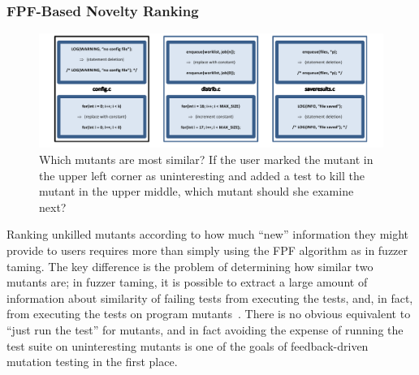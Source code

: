 \subsubsection{FPF-Based Novelty Ranking}
\label{sec:fpfplan}

\begin{figure}[t]
\centering
\includegraphics[width=0.95\columnwidth]{distmetric}

\caption{Which mutants are most similar?  If the user marked the
  mutant in the upper left corner as uninteresting and added a test
  to kill the
  mutant in the upper middle, which mutant
  should she examine next?}
\label{fig:distances}
\end{figure}

Ranking unkilled mutants according to how much ``new'' information they might
provide to users requires more than simply using the FPF algorithm as
in fuzzer taming.  The key difference is the problem of determining
how similar two mutants are; in fuzzer taming, it is possible to
extract a large amount of information about similarity of failing
tests from executing the tests, and, in fact, from executing the tests
on program mutants~\cite{PLDI13,distMut}.  There is no obvious
equivalent to
``just run the test'' for mutants, and in fact avoiding the expense of running
the test suite on uninteresting mutants is one of the goals of
feedback-driven mutation testing in the first place.

